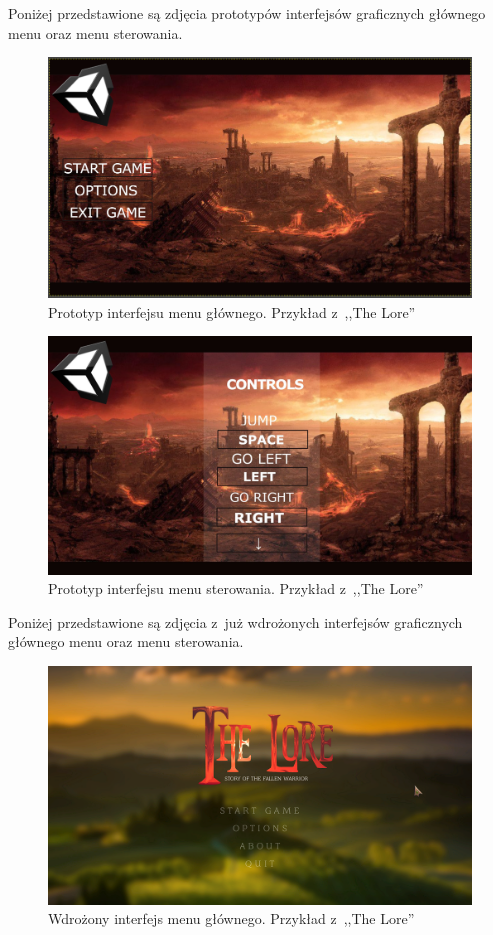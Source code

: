 \documentclass[oneside,polski,logo]{amuthesis}
\begin{document}
Poniżej przedstawione są zdjęcia prototypów interfejsów graficznych głównego menu oraz menu sterowania.

\begin{figure}[h]
	\centering
	\includegraphics[width=14cm]{images/hyps/proto.png}
	\caption{Prototyp interfejsu menu głównego. Przykład z~,,The Lore''}
\end{figure}

\begin{figure}[h]
	\centering
	\includegraphics[width=14cm]{images/hyps/proto2.jpg}
	\caption{Prototyp interfejsu menu sterowania. Przykład z~,,The Lore''}
\end{figure}

Poniżej przedstawione są zdjęcia z~już wdrożonych interfejsów graficznych głównego menu oraz menu sterowania.

\begin{figure}[h!]
	\centering
	\includegraphics[width=14cm]{images/hyps/of1.png}
	\caption{Wdrożony interfejs menu głównego. Przykład z~,,The Lore''}
\end{figure}
\end{document}
